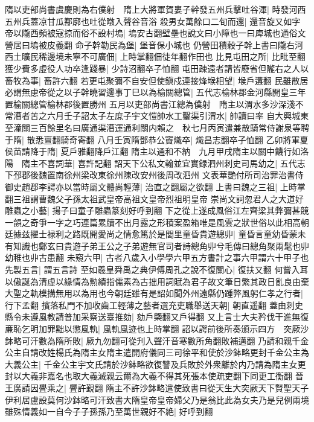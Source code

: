 隋以吏部尚書虞慶則為右僕射　隋上大將軍賀婁子幹發五州兵擊吐谷渾|{
	時發河西五州兵蓋凉甘瓜鄯廓也吐從暾入聲谷音浴}
殺男女萬餘口二旬而還|{
	還音旋又如字}
帝以隴西頻被寇掠而俗不設村塢|{
	塢安古翻壁壘也說文曰小障也一曰庳城也通俗文營居曰塢被皮義翻}
命子幹勒民為堡|{
	堡音保小城也}
仍營田積穀子幹上書曰隴右河西土曠民稀邊境未寧不可廣佃|{
	上時掌翻佃徒年翻作田也}
比見屯田之所|{
	比毗至翻}
獲少費多虛役人功卒逢踐暴|{
	少詩沼翻卒子恤翻}
屯田疎遠者請皆廢省但隴右之人以畜牧為事|{
	畜許六翻}
若更屯聚彌不自安但使鎭戍連接烽堠相望|{
	堠戶遘翻}
民雖散居必謂無慮帝從之以子幹曉習邊事丁巳以為榆關總管|{
	五代志榆林郡金河縣開皇三年置榆關總管榆林郡後置勝州}
五月以吏部尚書江總為僕射　隋主以渭水多沙深淺不常漕者苦之六月壬子詔太子左庶子宇文愷帥水工鑿渠引渭水|{
	帥讀曰率}
自大興城東至潼關三百餘里名曰廣通渠漕運通利關内賴之　秋七月丙寅遣兼散騎常侍謝泉等聘于隋|{
	散悉亶翻騎奇寄翻}
八月壬寅隋鄧恭公竇熾卒|{
	熾昌志翻卒子恤翻}
乙卯將軍夏侯苗請降于隋|{
	夏戶雅翻降戶江翻}
隋主以通和不納　九月甲戌隋主以關中饑行如洛陽　隋主不喜詞華|{
	喜許記翻}
詔天下公私文翰並宜實録泗州刺史司馬幼之|{
	五代志下邳郡後魏置南徐州梁改東徐州陳改安州後周改泗州}
文表華艷付所司治罪治書侍御史趙郡李諤亦以當時屬文體尚輕薄|{
	治直之翻屬之欲翻}
上書曰魏之三祖|{
	上時掌翻三祖謂曹魏父子孫太祖武皇帝高祖文皇帝烈祖明皇帝}
崇尚文詞忽君人之大道好雕蟲之小藝|{
	揚子曰童子雕蟲篆刻好呼到翻}
下之從上遂成風俗江左齊梁其弊彌甚競一韻之奇爭一字之巧連篇累牘不出月露之形積案盈箱唯是風雲之狀世俗以此相高朝廷據兹擢士禄利之路既開愛尚之情愈篤於是閭里童昏貴遊總丱|{
	童昏言童幼昏蒙未有知識也鄭玄曰貴遊子弟王公之子弟遊無官司者詩總角丱兮毛傳曰總角聚兩髦也丱幼稚也丱古患翻}
未窺六甲|{
	古者八歲入小學學六甲五方書計之事六甲謂六十甲子也}
先製五言|{
	謂五言詩}
至如羲皇舜禹之典伊傅周孔之說不復關心|{
	復扶又翻}
何嘗入耳以傲誕為清虛以緣情為勲績指儒素為古拙用詞賦為君子故文筆日繁其政日亂良由棄大聖之軌模搆無用以為用也今朝廷雖有是詔如聞外州遠縣仍踵弊風躬仁孝之行者|{
	行下孟翻}
擯落私門不加收齒工輕薄之藝者選充吏職舉送天朝|{
	朝直遥翻}
蓋由刺史縣令未遵風教請普加采察送臺推劾|{
	劾戶槩翻又戶得翻}
又上言士大夫矜伐干進無復亷恥乞明加罪黜以懲風軌|{
	風軌風迹也上時掌翻}
詔以諤前後所奏頒示四方　突厥沙鉢略可汗數為隋所敗|{
	厥九勿翻可從刋入聲汗音寒數所角翻敗補邁翻}
乃請和親千金公主自請改姓楊氏為隋主女隋主遣開府儀同三司徐平和使於沙鉢略更封千金公主為大義公主|{
	千金公主宇文氏請於沙鉢略欲復讐及兵敗於外衆離於内乃請為隋主女更封以大義非嘉名也取大義滅親云爾為大義不得其死張本使疏吏翻下同更工衡翻}
晉王廣請因舋乘之|{
	舋許覲翻}
隋主不許沙鉢略遣使致書曰從天生大突厥天下賢聖天子伊利居盧設莫何沙鉢略可汗致書大隋皇帝皇帝婦父乃是翁比此為女夫乃是兒例兩境雖殊情義如一自今子子孫孫乃至萬世親好不絶|{
	好呼到翻}
